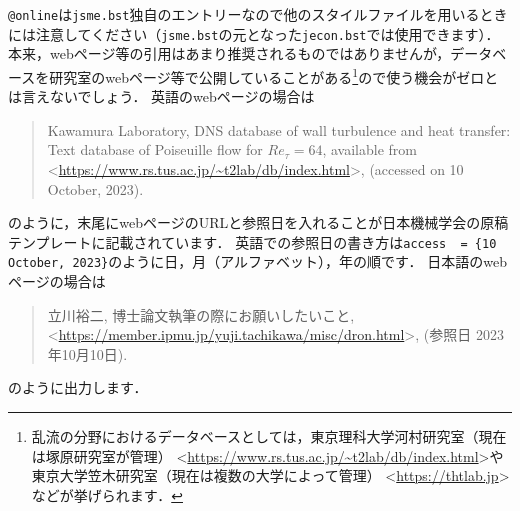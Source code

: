 \documentclass[a4paper,fleqn,uplatex,dvipdfmx]{jsarticle}
\makeatletter
\newcommand{\jsmefile}{\texttt{jsme.bst}}
\newcommand{\ttonline}{\texttt{@online}}
\makeatother
\begin{document}
\ttonline は\jsmefile 独自のエントリーなので他の\BibTeX{}スタイルファイルを用いるときには注意してください（\jsmefile の元となった\verb|jecon.bst|では使用できます）．
本来，webページ等の引用はあまり推奨されるものではありませんが，データベースを研究室のwebページ等で公開していることがある\footnote{乱流の分野におけるデータベースとしては，東京理科大学河村研究室（現在は塚原研究室が管理） \textless\url{https://www.rs.tus.ac.jp/~t2lab/db/index.html}\textgreater や東京大学笠木研究室（現在は複数の大学によって管理） \textless\url{https://thtlab.jp}\textgreater などが挙げられます．}ので使う機会がゼロとは言えないでしょう．
英語のwebページの場合は
\renewcommand\UrlFont{\rmfamily}
\begin{quote}
    Kawamura Laboratory, DNS database of wall turbulence and heat transfer: Text database of Poiseuille flow for $\mathit{Re}_\tau = 64$, available from \textless\url{https://www.rs.tus.ac.jp/~t2lab/db/index.html}\textgreater, (accessed on 10 October, 2023).
\end{quote}
のように，末尾にwebページのURLと参照日を入れることが日本機械学会の原稿テンプレートに記載されています．
英語での参照日の書き方は\verb|access  = {10 October, 2023}|のように日，月（アルファベット），年の順です．
日本語のwebページの場合は
\begin{quote}
    立川裕二, 博士論文執筆の際にお願いしたいこと, \textless\url{https://member.ipmu.jp/yuji.tachikawa/misc/dron.html}\textgreater, (参照日 2023年10月10日).
\end{quote}
\renewcommand\UrlFont{\ttfamily}
のように出力します．
\end{document}
